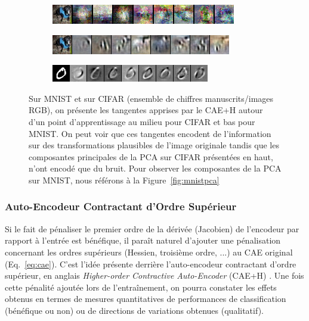 \begin{figure}
\centering
\begin{subfigure}{0.9\linewidth}
\includegraphics[width=0.9\linewidth]{predoc/images/pca.png}
\label{fig:tan_pca}
\end{subfigure}

\begin{subfigure}{0.9\linewidth}
\includegraphics[width=0.9\linewidth]{predoc/images/tangents_cifar.png}
\label{fig:tan_cifar}
\end{subfigure}

\begin{subfigure}{0.9\linewidth}
\includegraphics[width=0.9\linewidth]{predoc/images/tangents_mnist.png}
\label{fig:tan_mnist}
\end{subfigure}


   \caption[Vecteur Propres du CAE+H sur MNIST et CIFAR]{ Sur MNIST et sur CIFAR (ensemble de chiffres manuscrits/images RGB), on présente les
   tangentes apprises par le CAE+H autour d'un point d'apprentissage au milieu pour CIFAR et bas pour MNIST. On peut voir que ces
   tangentes encodent de l'information sur des transformations plausibles de
   l'image originale tandis que les composantes principales de la PCA sur CIFAR présentées en haut, n'ont
   encodé que du bruit. Pour observer les composantes de la PCA sur MNIST, nous référons à la Figure~\ref{fig:mnistpca}
\label{fig:tan}}

\end{figure}

\subsubsection{Auto-Encodeur Contractant d'Ordre Supérieur}

Si le fait de pénaliser le premier ordre de la dérivée (Jacobien) de l'encodeur
par rapport à l'entrée est bénéfique, il paraît naturel d'ajouter une pénalisation
concernant les ordres supérieurs (Hessien, troisième ordre, ...) au CAE
original (Eq.~\ref{eq:cae}).  C'est l'idée présente derrière l'auto-encodeur
contractant d'ordre supérieur, en anglais \textit{Higher-order Contractive
Auto-Encoder} (CAE+H) \citep{Salah+al-2011}.  Une fois cette pénalité ajoutée
lors de l'entraînement, on pourra constater les effets obtenus en termes de
mesures quantitatives de performances de classification (bénéfique ou non) ou
de directions de variations obtenues (qualitatif).

